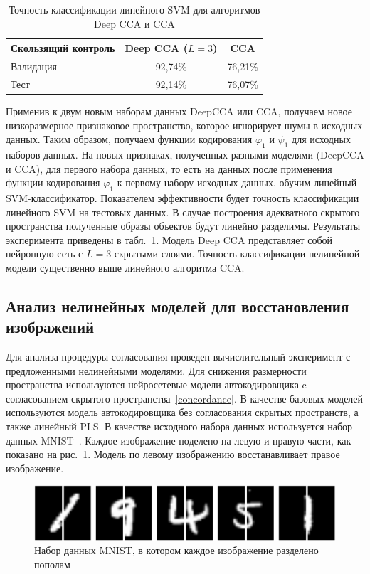 \documentclass[12pt]{article}
\begin{document}
\begin{table}[!bp]
\caption{Точность классификации линейного SVM для алгоритмов Deep CCA и CCA}
\centering
\begin{tabular}{l|cc}
\hline
	Скользящий контроль & Deep CCA ($L=3$) & CCA \\  \hline
	Валидация & 92,74\%  &  76,21\%\\
	Тест & 92,14\% & 76,07\% \\
	\hline
\end{tabular}
\label{tbl:1}
\end{table}

Применив к двум новым наборам данных DeepCCA или CCA, получаем новое низкоразмерное признаковое пространство, которое игнорирует шумы в исходных данных. Таким образом, получаем функции кодирования $\varphi_1$ и $\psi_1$ для исходных наборов данных. На новых признаках, полученных разными моделями (DeepCCA и CCA), для первого набора данных, то есть на данных после применения функции кодирования $\varphi_1$ к первому набору исходных данных, обучим линейный SVM-классификатор. Показателем эффективности будет точность классификации линейного SVM на тестовых данных. В случае построения адекватного скрытого пространства полученные образы объектов будут линейно разделимы. Результаты эксперимента приведены в табл.~\ref{tbl:1}. Модель Deep CCA представляет собой нейронную сеть с $L=3$ скрытыми слоями. Точность классификации нелинейной модели существенно выше линейного алгоритма CCA.

\subsection{Анализ нелинейных моделей для восстановления изображений}
Для анализа процедуры согласования проведен вычислительный эксперимент с предложенными нелинейными моделями.
Для снижения размерности пространства используются нейросетевые модели автокодировщика c согласованием скрытого пространства~\eqref{concordance}.
В качестве базовых моделей используются модель автокодировщика без согласования скрытых пространств, а также линейный PLS. В качестве исходного набора данных используется набор данных MNIST~\cite{MNIST}. Каждое изображение поделено на левую и правую части, как показано на рис.~\ref{fgr:3}. Модель по левому изображению восстанавливает правое изображение.

\begin{figure}[!tp]
\centering \includegraphics[width=\linewidth]{figures/left_right_mnist}
\caption{Набор данных MNIST, в котором каждое изображение разделено пополам}
\label{fgr:3}
\end{figure}
\end{document}
